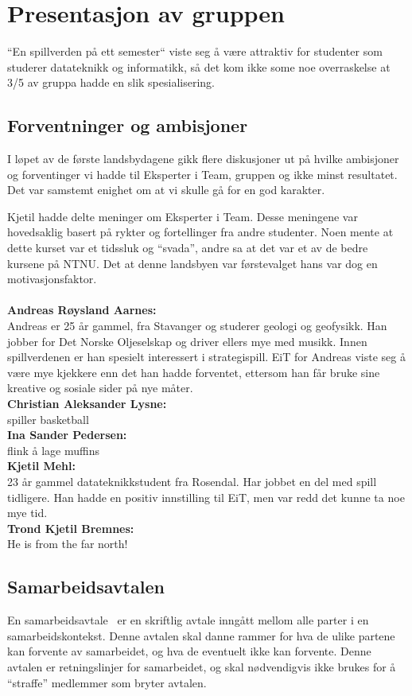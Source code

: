 \section{Presentasjon av gruppen}
``En spillverden på ett semester`` viste seg å være attraktiv for
studenter som studerer datateknikk og informatikk, så det kom ikke some
noe overraskelse at 3/5 av gruppa hadde en slik spesialisering.

\subsection{Forventninger og ambisjoner}
I løpet av de første landsbydagene gikk flere diskusjoner ut på hvilke
ambisjoner og forventinger vi hadde til Eksperter i Team, gruppen og
ikke minst resultatet. Det var samstemt enighet om at vi skulle gå for
en god karakter.

Kjetil hadde delte meninger om Eksperter i Team. Desse meningene var
hovedsaklig basert på rykter og fortellinger fra andre studenter. Noen
mente at dette kurset var et tidssluk og ``svada'', andre sa at det var
et av de bedre kursene på NTNU. Det at denne landsbyen var førstevalget
hans var dog en motivasjonsfaktor.
\\
\\
\textbf{Andreas Røysland Aarnes:}\\
Andreas er 25 år gammel, fra Stavanger og studerer geologi og geofysikk. Han jobber for Det Norske Oljeselskap og driver ellers mye med musikk. Innen spillverdenen er han spesielt interessert i strategispill. EiT for Andreas viste seg å være mye kjekkere enn det han hadde forventet, ettersom han får bruke sine kreative og sosiale sider på nye måter. \\
\textbf{Christian Aleksander Lysne:}\\
spiller basketball \\
\textbf{Ina Sander Pedersen:}\\
flink å lage muffins \\
\textbf{Kjetil Mehl:}\\
23 år gammel datateknikkstudent fra Rosendal. Har jobbet en del med
spill tidligere. Han hadde en positiv innstilling til EiT, men var
redd det kunne ta noe mye tid.\\
\textbf{Trond Kjetil Bremnes:}\\
He is from the far north! \\

\subsection{Samarbeidsavtalen}
En samarbeidsavtale~\cite{samarbeidsavtale} er en skriftlig avtale
inngått mellom alle parter i en samarbeidskontekst. Denne avtalen skal
danne rammer for hva de ulike partene kan forvente av samarbeidet, og
hva de eventuelt ikke kan forvente. Denne avtalen er retningslinjer for
samarbeidet, og skal nødvendigvis ikke brukes for å ``straffe''
medlemmer som bryter avtalen.

